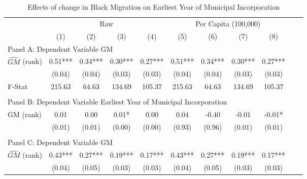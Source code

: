  \begin{table}[htbp]\centering {} \begin{threeparttable} \caption{Effects of change in Black Migration on Earliest Year of Municipal Incorporation} \begin{tabular}{l*{10}{c}} \toprule
                &\multicolumn{4}{c}{Raw}                                    &\multicolumn{4}{c}{Per Capita (100,000)}                   \\\cmidrule(lr){2-5}\cmidrule(lr){6-9}
                &\multicolumn{1}{c}{(1)}   &\multicolumn{1}{c}{(2)}   &\multicolumn{1}{c}{(3)}   &\multicolumn{1}{c}{(4)}   &\multicolumn{1}{c}{(5)}   &\multicolumn{1}{c}{(6)}   &\multicolumn{1}{c}{(7)}   &\multicolumn{1}{c}{(8)}   \\
\cmidrule(lr){1-9}
\multicolumn{8}{l}{Panel A: Dependent Variable GM}\\
\cmidrule(lr){1-9}
$\hat{GM}$ (rank)&       0.51***&       0.34***&       0.30***&       0.27***&       0.51***&       0.34***&       0.30***&       0.27***\\
                &     (0.04)   &     (0.04)   &     (0.03)   &     (0.03)   &     (0.04)   &     (0.04)   &     (0.03)   &     (0.03)   \\
\midrule
F-Stat          &     215.63   &      64.63   &     134.69   &     105.37   &     215.63   &      64.63   &     134.69   &     105.37   \\
\cmidrule[\heavyrulewidth](lr){1-9} \\ \cmidrule[\heavyrulewidth](lr){1-9}
\multicolumn{8}{l}{Panel B: Dependent Variable Earliest Year of Municipal Incorporation}\\
\cmidrule(lr){1-9}
GM  (rank)      &       0.01   &       0.00   &       0.01*  &       0.00   &       0.04   &      -0.40   &      -0.01   &      -0.01*  \\
                &     (0.01)   &     (0.01)   &     (0.00)   &     (0.00)   &     (0.93)   &     (0.96)   &     (0.01)   &     (0.01)   \\
\cmidrule[\heavyrulewidth](lr){1-9} \\ \cmidrule[\heavyrulewidth](lr){1-9}
\multicolumn{8}{l}{Panel C: Dependent Variable GM}\\
\cmidrule(lr){1-9}
$\hat{GM}$ (rank)&       0.43***&       0.27***&       0.19***&       0.17***&       0.43***&       0.27***&       0.19***&       0.17***\\
                &     (0.04)   &     (0.05)   &     (0.03)   &     (0.03)   &     (0.04)   &     (0.05)   &     (0.03)   &     (0.03)   \\

\end{tabular}
\end{threeparttable}
\end{table}
